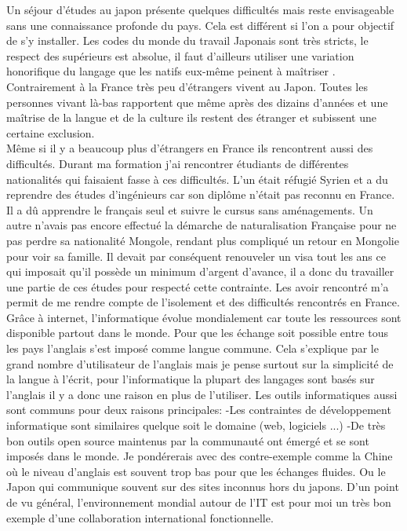 \documentclass[french,a4paper,12pt]{report}
\begin{document}
Un séjour d'études au japon présente quelques difficultés mais reste envisageable sans une connaissance profonde du pays. Cela est différent si l'on a pour objectif de s'y installer.
Les codes du monde du travail Japonais sont très stricts, le respect des supérieurs est absolue, il faut d'ailleurs utiliser une variation honorifique du langage que les natifs eux-même peinent à maîtriser .
Contrairement à la France très peu d'étrangers vivent au Japon. Toutes les personnes vivant là-bas rapportent que même après des dizains d’années et une maîtrise de la langue et de la culture ils restent des étranger et subissent une certaine exclusion.\\

Même si il y a beaucoup plus d'étrangers en France ils rencontrent aussi des difficultés. Durant ma formation j'ai rencontrer étudiants de différentes nationalités qui faisaient fasse à ces difficultés. L'un était réfugié Syrien et a du reprendre des études d'ingénieurs car son diplôme n'était pas reconnu en France. Il a dû apprendre le français seul et suivre le cursus sans aménagements.
Un autre n'avais pas encore effectué la démarche de naturalisation Française pour ne pas perdre sa nationalité Mongole, rendant plus compliqué un retour en Mongolie pour voir sa famille. Il devait par conséquent renouveler un visa tout les ans ce qui imposait qu'il possède un minimum d'argent d'avance, il a donc du travailler une partie de ces études pour respecté cette contrainte.
Les avoir rencontré m'a permit de me rendre compte de l'isolement et des difficultés rencontrés en France.\\

Grâce à internet, l’informatique évolue mondialement car toute les ressources sont disponible partout dans le monde. Pour que les échange soit possible entre tous les pays  l’anglais s’est imposé comme langue commune. Cela s’explique par le grand nombre d’utilisateur de l’anglais mais je pense surtout sur la simplicité de la langue à l’écrit, pour l’informatique la plupart des langages sont basés sur l’anglais il y a donc une raison en plus de l’utiliser.
Les outils informatiques aussi sont communs pour deux raisons principales:
-Les contraintes de développement informatique sont similaires quelque soit le domaine (web, logiciels ...)
-De très bon outils open source maintenus par la communauté ont émergé et se sont imposés dans le monde.
Je pondérerais avec des contre-exemple comme la Chine où le niveau d’anglais est souvent trop bas pour que les échanges fluides. Ou le Japon qui communique souvent sur des sites inconnus hors du japons. 
D’un point de vu général, l’environnement mondial autour de l’IT est pour moi un très bon exemple d’une collaboration international fonctionnelle.\\
\end{document}
